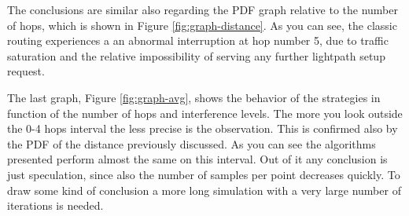 \documentclass[9pt,twocolumn]{article}
\begin{document}
The conclusions are similar also regarding the PDF graph relative to the number of hops, which is shown in Figure \ref{fig:graph-distance}. As you can see, the classic routing experiences a an abnormal interruption at hop number 5, due to traffic saturation and the relative impossibility of serving any further lightpath setup request.

The last graph, Figure \ref{fig:graph-avg}, shows the behavior of the strategies in function of the number of hops and interference levels. The more you look outside the 0-4 hops interval the less precise is the observation. This is confirmed also by the PDF of the distance previously discussed. As you can see the algorithms presented perform almost the same on this interval. Out of it any conclusion is just speculation, since also the number of samples per point decreases quickly. To draw some kind of conclusion a more long simulation with a very large number of iterations is needed.
\end{document}
